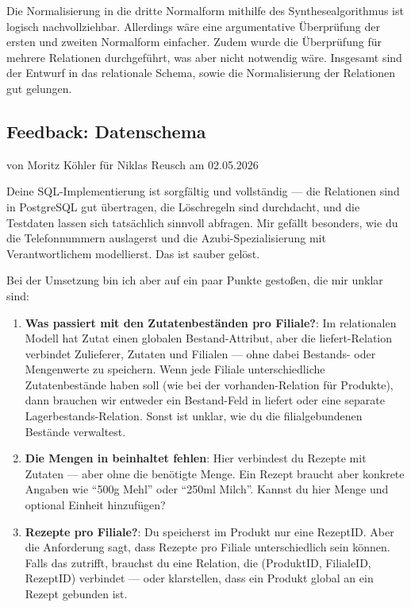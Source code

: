 \documentclass[a4paper]{article}
\begin{document}
Die Normalisierung in die dritte Normalform mithilfe des Synthesealgorithmus ist logisch nachvollziehbar. Allerdings wäre eine argumentative Überprüfung der ersten und zweiten Normalform einfacher. Zudem wurde die Überprüfung für mehrere Relationen durchgeführt, was aber nicht notwendig wäre. Insgesamt sind der Entwurf in das relationale Schema, sowie die Normalisierung der Relationen gut gelungen.

\newpage
\subsection{Feedback: Datenschema}

\begin{flushright}
von Moritz Köhler für Niklas Reusch am 02.05.2026
\end{flushright}

Deine SQL-Implementierung ist sorgfältig und vollständig — die Relationen sind in PostgreSQL gut übertragen, die Löschregeln sind durchdacht, und die Testdaten lassen sich tatsächlich sinnvoll abfragen. Mir gefällt besonders, wie du die Telefonnummern auslagerst und die Azubi-Spezialisierung mit Verantwortlichem modellierst. Das ist sauber gelöst.

Bei der Umsetzung bin ich aber auf ein paar Punkte gestoßen, die mir unklar sind:

\begin{enumerate}
    \item \textbf{Was passiert mit den Zutatenbeständen pro Filiale?}: Im relationalen Modell hat Zutat einen globalen Bestand-Attribut, aber die liefert-Relation verbindet Zulieferer, Zutaten und Filialen — ohne dabei Bestands- oder Mengenwerte zu speichern. Wenn jede Filiale unterschiedliche Zutatenbestände haben soll (wie bei der vorhanden-Relation für Produkte), dann brauchen wir entweder ein Bestand-Feld in liefert oder eine separate Lagerbestands-Relation. Sonst ist unklar, wie du die filialgebundenen Bestände verwaltest.

    \item \textbf{Die Mengen in beinhaltet fehlen}: Hier verbindest du Rezepte mit Zutaten — aber ohne die benötigte Menge. Ein Rezept braucht aber konkrete Angaben wie ``500g Mehl'' oder ``250ml Milch''. Kannst du hier Menge und optional Einheit hinzufügen?

    \item \textbf{Rezepte pro Filiale?}: Du speicherst im Produkt nur eine RezeptID. Aber die Anforderung sagt, dass Rezepte pro Filiale unterschiedlich sein können. Falls das zutrifft, brauchst du eine Relation, die (ProduktID, FilialeID, RezeptID) verbindet — oder klarstellen, dass ein Produkt global an ein Rezept gebunden ist.
\end{enumerate}
\end{document}

